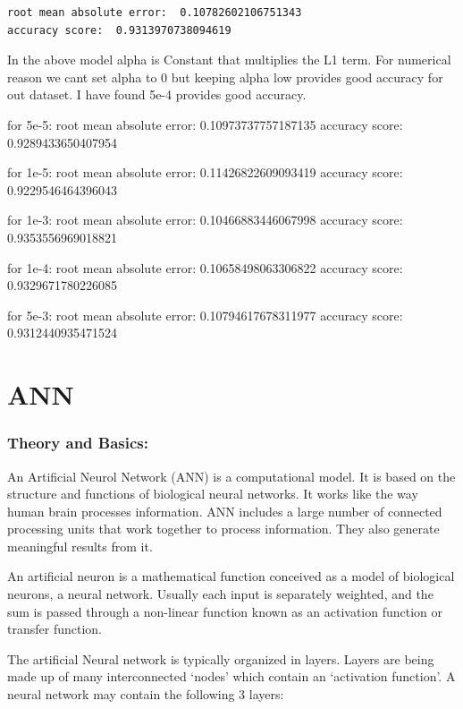 \documentclass[11pt, a4paper , landscape]{article}
\begin{document}
    \begin{Verbatim}[commandchars=\\\{\}]
 root mean absolute error:  0.10782602106751343
accuracy score:  0.9313970738094619

    \end{Verbatim}

    In the above model alpha is Constant that multiplies the L1 term. For
numerical reason we cant set alpha to 0 but keeping alpha low provides
good accuracy for out dataset. I have found 5e-4 provides good accuracy.

for 5e-5: root mean absolute error: 0.10973737757187135 accuracy score:
0.9289433650407954

for 1e-5: root mean absolute error: 0.11426822609093419 accuracy score:
0.9229546464396043

for 1e-3: root mean absolute error: 0.10466883446067998 accuracy score:
0.9353556969018821

for 1e-4: root mean absolute error: 0.10658498063306822 accuracy score:
0.9329671780226085

for 5e-3: root mean absolute error: 0.10794617678311977 accuracy score:
0.9312440935471524

    \section{ANN}\label{ann}

\subsubsection{Theory and Basics:}\label{theory-and-basics}

An Artificial Neurol Network (ANN) is a computational model. It is based
on the structure and functions of biological neural networks. It works
like the way human brain processes information. ANN includes a large
number of connected processing units that work together to process
information. They also generate meaningful results from it.

An artificial neuron is a mathematical function conceived as a model of
biological neurons, a neural network. Usually each input is separately
weighted, and the sum is passed through a non-linear function known as
an activation function or transfer function.

The artificial Neural network is typically organized in layers. Layers
are being made up of many interconnected `nodes' which contain an
`activation function'. A neural network may contain the following 3
layers:
\end{document}
